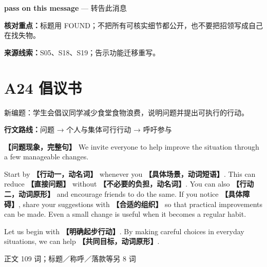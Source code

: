 \documentclass[11pt,a4paper,fontset=macnew]{ctexart}
\newenvironment{writing}{\begingroup\fontsize{10.5}{13.5}\selectfont\setlength{\parskip}{3pt}}{\par\endgroup}
\begin{document}
{\small\textbf{pass on this message} — 转告此消息}\par
{\small\textbf{核对重点：}标题用 FOUND；不把所有可核实细节都公开，也不要把招领写成自己在找失物。}\par
{\fontsize{8}{10}\selectfont\textbf{来源线索：}S05、S18、S19；告示功能迁移重写。}\par
\clearpage\section*{A24  倡议书}
{\small 新编题：学生会倡议同学减少食堂食物浪费，说明问题并提出可执行的行动。}\par
{\small\textbf{行文路线：}问题 → 个人与集体可行行动 → 呼吁参与}\par
\par\vspace{4pt}{\bfseries 可替换模板}\par\nopagebreak
\begin{writing}
{\par}
{\bfseries 【问题现象，完整句】} We invite everyone to help improve the situation through a few manageable changes.

Start by {\bfseries 【行动一，动名词】} whenever you {\bfseries 【具体场景，动词短语】}. This can reduce {\bfseries 【直接问题】} without {\bfseries 【不必要的负担，动名词】}. You can also {\bfseries 【行动二，动词原形】} and encourage friends to do the same. If you notice {\bfseries 【具体障碍】}, share your suggestions with {\bfseries 【合适的组织】} so that practical improvements can be made. Even a small change is useful when it becomes a regular habit.

Let us begin with {\bfseries 【明确起步行动】}. By making careful choices in everyday situations, we can help {\bfseries 【共同目标，动词原形】}.

\par
\end{writing}
\par\vspace{4pt}{\bfseries 完整套用示例}\par\nopagebreak
{\small 正文 109 词；标题／称呼／落款等另 8 词}\par
\end{document}
